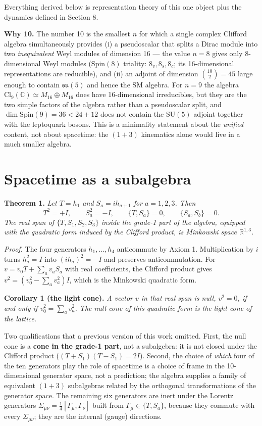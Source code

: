\documentclass[aps,prd,twocolumn,amsmath,amssymb,superscriptaddress,nofootinbib,floatfix]{revtex4-2}
\begin{document}
Everything derived below is representation theory of this one object
plus the dynamics defined in Section 8.

\textbf{Why 10.} The number 10 is the smallest \(n\) for which a single
complex Clifford algebra simultaneously provides (i) a pseudoscalar that
splits a Dirac module into two \emph{inequivalent} Weyl modules of
dimension 16 --- the value \(n = 8\) gives only 8-dimensional Weyl
modules (\(\mathrm{Spin}(8)\) triality: \(8_v, 8_s, 8_c\); its
16-dimensional representations are reducible), and (ii) an adjoint of
dimension \(\binom{10}{2} = 45\) large enough to contain
\(\mathfrak{su}(5)\) and hence the SM algebra. For \(n = 9\) the algebra
\(\mathrm{Cl}_9(\mathbb{C}) \simeq M_{16}\oplus M_{16}\) does have
16-dimensional irreducibles, but they are the two simple factors of the
algebra rather than a pseudoscalar split, and
\(\dim\mathrm{Spin}(9) = 36 < 24 + 12\) does not contain the
\(\mathrm{SU}(5)\) adjoint together with the leptoquark bosons. This is
a minimality statement about the \emph{unified} content, not about
spacetime: the \((1{+}3)\) kinematics alone would live in a much smaller
algebra.

\section{Spacetime as a subalgebra}\label{spacetime-as-a-subalgebra}

\textbf{Theorem 1.} \emph{Let \(T = h_1\) and \(S_a = i h_{a+1}\) for
\(a = 1,2,3\). Then}
\[T^2 = +I,\qquad S_a^2 = -I,\qquad \{T,S_a\} = 0,\qquad \{S_a,S_b\} = 0 .\]
\emph{The real span of \(\{T, S_1, S_2, S_3\}\) inside the grade-1 part
of the algebra, equipped with the quadratic form induced by the Clifford
product, is Minkowski space \(\mathbb{R}^{1,3}\).}

\emph{Proof.} The four generators \(h_1,\dots,h_4\) anticommute by Axiom
1. Multiplication by \(i\) turns \(h_a^2 = I\) into \((i h_a)^2 = -I\)
and preserves anticommutation. For \(v = v_0 T + \sum_a v_a S_a\) with
real coefficients, the Clifford product gives
\(v^2 = (v_0^2 - \sum_a v_a^2)I\), which is the Minkowski quadratic
form.

\textbf{Corollary 1 (the light cone).} \emph{A vector \(v\) in that real
span is null, \(v^2 = 0\), if and only if \(v_0^2 = \sum_a v_a^2\). The
null cone of this quadratic form is the light cone of the lattice.}

Two qualifications that a previous version of this work omitted. First,
the null cone is a \textbf{cone in the grade-1 part}, not a subalgebra:
it is not closed under the Clifford product (\((T+S_1)(T-S_1) = 2I\)).
Second, the choice of \emph{which} four of the ten generators play the
role of spacetime is a choice of frame in the 10-dimensional generator
space, not a prediction; the algebra supplies a family of equivalent
\((1{+}3)\) subalgebras related by the orthogonal transformations of the
generator space. The remaining six generators are inert under the
Lorentz generators \(\Sigma_{\mu\nu} = \tfrac14[\Gamma_\mu,\Gamma_\nu]\)
built from \(\Gamma_\mu \in \{T,S_a\}\), because they commute with every
\(\Sigma_{\mu\nu}\); they are the internal (gauge) directions.
\end{document}
